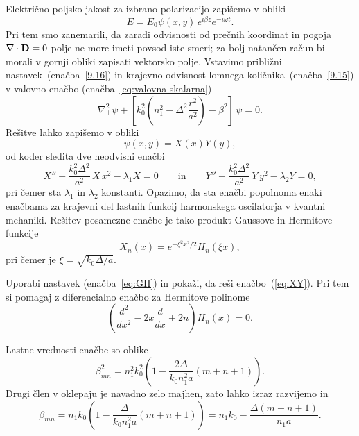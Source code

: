 Električno poljsko jakost za izbrano polarizacijo zapišemo v obliki 
\begin{equation}
E=E_{0}\psi(x,y)\, e^{i\beta z} e^{-i\omega t}.
\label{9.16}
\end{equation}
Pri tem smo zanemarili, da zaradi odvisnosti od prečnih koordinat in pogoja $\nabla\cdot{\bf D}=0$
polje ne more imeti povsod iste smeri; za bolj natančen račun bi morali v gornji obliki 
zapisati vektorsko polje. Vstavimo približni
nastavek~(enačba~\ref{9.16}) in krajevno odvisnost lomnega količnika~(enačba~\ref{9.15})
v valovno enačbo (enačba~\ref{eq:valovna-skalarna}) 
\begin{equation}
\nabla_{\perp}^{2}\psi+\left[k_{0}^{2}\left(n_{1}^{2}-\Delta^{2}\frac{r^{2}}{a^2}\right)-
\beta^{2}\right]\,\psi=0.
\label{9.17}
\end{equation}
Rešitve lahko zapišemo v obliki
\begin{equation}
\psi(x,y) = X(x)Y(y),
\end{equation}
od koder sledita dve neodvisni enačbi
\begin{equation}
X'' - \frac{k_0^2 \Delta^2}{a^2}\,X\,x^2 - \lambda_1 X = 0 \qquad \mathrm{in} \qquad
Y'' - \frac{k_0^2 \Delta^2}{a^2}\,Y\,y^2 - \lambda_2 Y = 0,
\label{eq:XY}
\end{equation}
pri čemer sta $\lambda_1$ in $\lambda_2$ konstanti. 
Opazimo, da sta enačbi popolnoma enaki enačbama za krajevni del lastnih funkcij 
harmonskega oscilatorja v kvantni mehaniki. Rešitev posamezne enačbe je tako 
produkt Gaussove in Hermitove funkcije
\begin{equation}
X_n(x) = e^{-\xi^2 x^2/2} H_n(\xi x),
\label{eq:GH}
\end{equation}
pri čemer je $\xi = \sqrt{k_0 \Delta/a}$.
\begin{definition}
Uporabi nastavek (enačba~\ref{eq:GH}) in pokaži, da reši enačbo~(\ref{eq:XY}). Pri tem si pomagaj z 
diferencialno enačbo za Hermitove polinome
\begin{equation}
\left( \frac{d^2}{dx^2}-2x\frac{d}{dx}+2n \right) H_n(x) = 0.
\end{equation}
\end{definition}
Lastne vrednosti enačbe so oblike
\begin{equation}
\beta_{mn}^{2}=n_{1}^{2}k_{0}^{2}\left(1-\frac{2\Delta}{k_{0}n_{1}^2a}\left(m+n+1\right)\right).
\label{9.19}
\end{equation}
Drugi člen v oklepaju je navadno zelo majhen, zato lahko izraz razvijemo in 
\begin{equation}
\beta_{mn}=n_{1}k_{0}\left(1-\frac{\Delta}{k_{0}n_{1}^2 a}\left(m+n+1\right)\right)
= n_{1}k_{0} - \frac{\Delta \left(m+n+1\right)}{n_{1} a}.
\end{equation}
